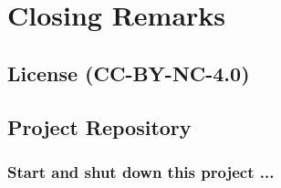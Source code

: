 \section{Closing Remarks}\label{sec:closing-remarks}

\subsection{License (CC-BY-NC-4.0)}\label{subsec:license}

\subsection{Project Repository}\label{subsec:project-repository}

\subsubsection*{Start and shut down this project ...}
